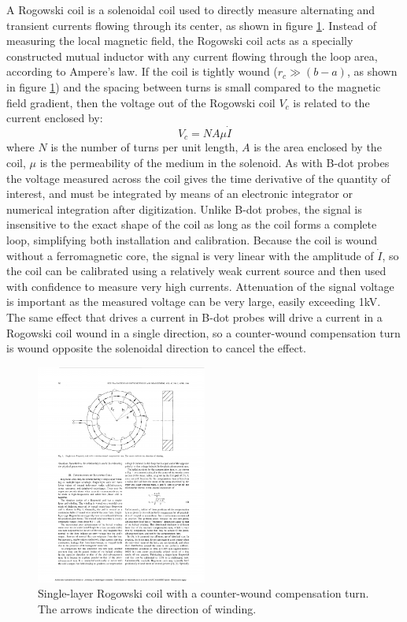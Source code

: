 \documentclass{jpp}
\begin{document}
A Rogowski coil is a solenoidal coil used to directly measure alternating and transient currents flowing through its center, as shown in figure \ref{fig:rogowski}. Instead of measuring the local magnetic field, the Rogowski coil acts as a specially constructed mutual inductor with any current flowing through the loop area, according to Ampere's law. If the coil is tightly wound ($r_c \gg (b - a)$, as shown in figure \ref{fig:rogowski}) and the spacing between turns is small compared to the magnetic field gradient, then the voltage out of the Rogowski coil $V_c$ is related to the current enclosed by:
\begin{equation*}
V_c = N A \mu \dot I
\end{equation*}
where $N$ is the number of turns per unit length, $A$ is the area enclosed by the coil, $\mu$ is the permeability of the medium in the solenoid. As with B-dot probes the voltage measured across the coil gives the time derivative of the quantity of interest, and must be integrated by means of an electronic integrator or numerical integration after digitization. Unlike B-dot probes, the signal is insensitive to the exact shape of the coil as long as the coil forms a complete loop, simplifying both installation and calibration. Because the coil is wound without a ferromagnetic core, the signal is very linear with the amplitude of $\dot{I}$, so the coil can be calibrated using a relatively weak current source and then used with confidence to measure very high currents. Attenuation of the signal voltage is important as the measured voltage can be very large, easily exceeding 1kV. The same effect that drives a current in B-dot probes will drive a current in a Rogowski coil wound in a single direction, so a counter-wound compensation turn is wound opposite the solenoidal direction to cancel the effect.

\begin{figure}
  \centering
  \includegraphics[width=0.5\textwidth]{rogowski.pdf}%
  \caption{Single-layer Rogowski coil with a counter-wound compensation turn. The arrows indicate the direction of winding. \citep{492777}}
\label{fig:rogowski}
\end{figure}
\end{document}
